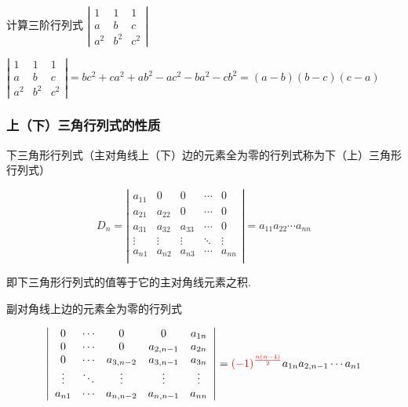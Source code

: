\begin{example}
    计算三阶行列式
    $ \left|\begin{array}{ccc}
            1     & 1     & 1     \\
            a     & b     & c     \\
            a^{2} & b^{2} & c^{2}
        \end{array}\right| $
\end{example}
\begin{solution}
    $ \left|\begin{array}{ccc}
            1     & 1     & 1     \\
            a     & b     & c     \\
            a^{2} & b^{2} & c^{2}
        \end{array}\right|=bc^{2}+ca^{2}+ab^{2}-ac^{2}-ba^{2}-cb^{2}=(a-b)(b-c)(c-a)$
\end{solution}

\subsubsection{上（下）三角行列式的性质}

下三角形行列式（主对角线上（下）边的元素全为零的行列式称为下（上）三角形行列式）

$$D_{n}= \left|\begin{array}{ccccc}
        a_{11} & 0      & 0      & \cdots & 0      \\
        a_{21} & a_{22} & 0      & \cdots & 0      \\
        a_{31} & a_{32} & a_{33} & \cdots & 0      \\
        \vdots & \vdots & \vdots & \ddots & \vdots \\
        a_{n1} & a_{n2} & a_{n3} & \cdots & a_{nn} \\
    \end{array}\right| =a_{11}a_{22}\cdots a_{nn}$$

即下三角形行列式的值等于它的主对角线元素之积.

副对角线上边的元素全为零的行列式

$$
    \left|\begin{array}{ccccc}
        0      & \cdots & 0         & 0         & a_{1n} \\
        0      & \cdots & 0         & a_{2,n-1} & a_{2n} \\
        0      & \cdots & a_{3,n-2} & a_{3,n-1} & a_{3n} \\
        \vdots & \ddots & \vdots    & \vdots    & \vdots \\
        a_{n1} & \cdots & a_{n,n-2} & a_{n,n-1} & a_{nn} \\
    \end{array}\right| =\textcolor{red}{(-1)^{\frac{n(n-1)}{2}}}a_{1n}a_{2,n-1}\cdots a_{n1}$$


